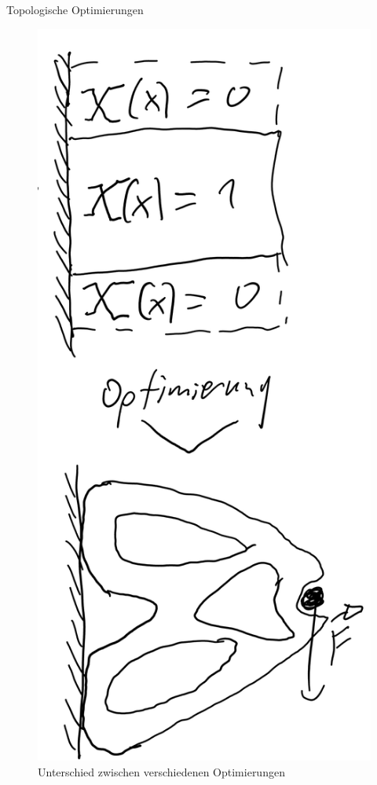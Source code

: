 \documentclass{beamer}
\begin{document}
\begin{frame}{Topologische Optimierungen}
\begin{figure}[htbp]
\begin{minipage}{0.2\textwidth}
        \end{minipage}\hfill
        \begin{minipage}{0.2\textwidth}
            \centering
            \includegraphics[width=\linewidth]{figures/Topo-opt.png}
            \caption{Topologische Optimierung}
        \end{minipage}
        \caption{Unterschied zwischen verschiedenen Optimierungen}
        \label{fig:unterschied}
    \end{figure}
\end{frame}
\end{document}
